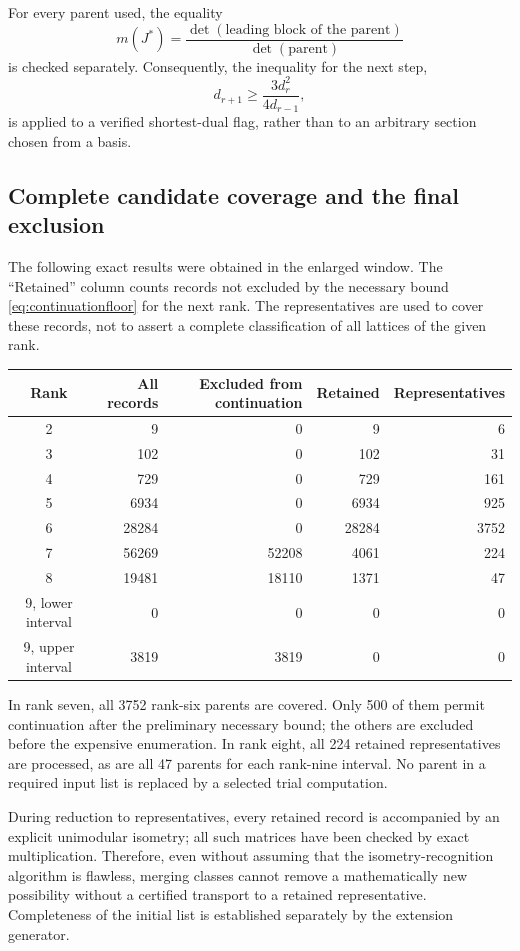 \documentclass[11pt,a4paper]{article}
\theoremstyle{remark}\newtheorem{remark}[theorem]{Remark}
\begin{document}
For every parent used, the equality
\[
m(J^*)=
\frac{\det(\text{leading block of the parent})}{\det(\text{parent})}
\]
is checked separately. Consequently, the inequality for the next step,
\begin{equation}\label{eq:continuationfloor}
d_{r+1}\ge\frac{3d_r^2}{4d_{r-1}},
\end{equation}
is applied to a verified shortest-dual flag, rather than to an arbitrary section chosen from a basis.

\subsection{Complete candidate coverage and the final exclusion}

The following exact results were obtained in the enlarged window. The ``Retained'' column counts records not excluded by the necessary bound \eqref{eq:continuationfloor} for the next rank. The representatives are used to cover these records, not to assert a complete classification of all lattices of the given rank.
\begin{center}
\begin{tabular}{crrrr}
\toprule
Rank & All records & Excluded from continuation & Retained & Representatives\\\midrule
2&9&0&9&6\\
3&102&0&102&31\\
4&729&0&729&161\\
5&6934&0&6934&925\\
6&28284&0&28284&3752\\
7&56269&52208&4061&224\\
8&19481&18110&1371&47\\
9, lower interval&0&0&0&0\\
9, upper interval&3819&3819&0&0\\
\bottomrule
\end{tabular}
\end{center}

In rank seven, all 3752 rank-six parents are covered. Only 500 of them permit continuation after the preliminary necessary bound; the others are excluded before the expensive enumeration. In rank eight, all 224 retained representatives are processed, as are all 47 parents for each rank-nine interval. No parent in a required input list is replaced by a selected trial computation.

During reduction to representatives, every retained record is accompanied by an explicit unimodular isometry; all such matrices have been checked by exact multiplication. Therefore, even without assuming that the isometry-recognition algorithm is flawless, merging classes cannot remove a mathematically new possibility without a certified transport to a retained representative. Completeness of the initial list is established separately by the extension generator.
\end{document}
